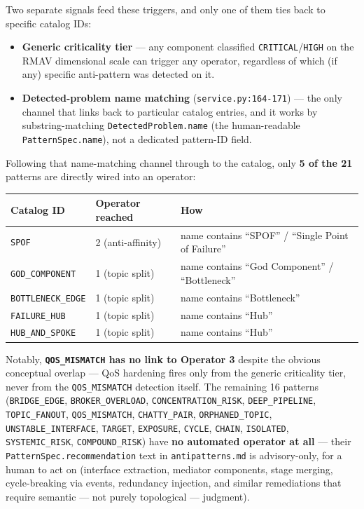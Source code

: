 \documentclass[11pt]{article}
\begin{document}
Two separate signals feed these triggers, and only one of them ties back to specific catalog IDs:

\begin{itemize}[leftmargin=*]
\item \textbf{Generic criticality tier} --- any component classified \texttt{CRITICAL}/\texttt{HIGH} on the RMAV dimensional scale can trigger any operator, regardless of which (if any) specific anti-pattern was detected on it.
\item \textbf{Detected-problem name matching} (\texttt{service.py:164-171}) --- the only channel that links back to particular catalog entries, and it works by substring-matching \texttt{DetectedProblem.name} (the human-readable \texttt{PatternSpec.name}), not a dedicated pattern-ID field.
\end{itemize}

Following that name-matching channel through to the catalog, only \textbf{5 of the 21} patterns are directly wired into an operator:

\begin{center}
\begin{tabular}{@{}lll@{}}
\toprule
\textbf{Catalog ID} & \textbf{Operator reached} & \textbf{How} \\
\midrule
\texttt{SPOF} & 2 (anti-affinity) & name contains ``SPOF'' / ``Single Point of Failure'' \\
\texttt{GOD\_COMPONENT} & 1 (topic split) & name contains ``God Component'' / ``Bottleneck'' \\
\texttt{BOTTLENECK\_EDGE} & 1 (topic split) & name contains ``Bottleneck'' \\
\texttt{FAILURE\_HUB} & 1 (topic split) & name contains ``Hub'' \\
\texttt{HUB\_AND\_SPOKE} & 1 (topic split) & name contains ``Hub'' \\
\bottomrule
\end{tabular}
\end{center}

Notably, \textbf{\texttt{QOS\_MISMATCH} has no link to Operator 3} despite the obvious conceptual overlap --- QoS hardening fires only from the generic criticality tier, never from the \texttt{QOS\_MISMATCH} detection itself. The remaining 16 patterns (\texttt{BRIDGE\_EDGE}, \texttt{BROKER\_OVERLOAD}, \texttt{CONCENTRATION\_RISK}, \texttt{DEEP\_PIPELINE}, \texttt{TOPIC\_FANOUT}, \texttt{QOS\_MISMATCH}, \texttt{CHATTY\_PAIR}, \texttt{ORPHANED\_TOPIC}, \texttt{UNSTABLE\_INTERFACE}, \texttt{TARGET}, \texttt{EXPOSURE}, \texttt{CYCLE}, \texttt{CHAIN}, \texttt{ISOLATED}, \texttt{SYSTEMIC\_RISK}, \texttt{COMPOUND\_RISK}) have \textbf{no automated operator at all} --- their \texttt{PatternSpec.recommendation} text in \texttt{antipatterns.md} is advisory-only, for a human to act on (interface extraction, mediator components, stage merging, cycle-breaking via events, redundancy injection, and similar remediations that require semantic --- not purely topological --- judgment).
\end{document}
